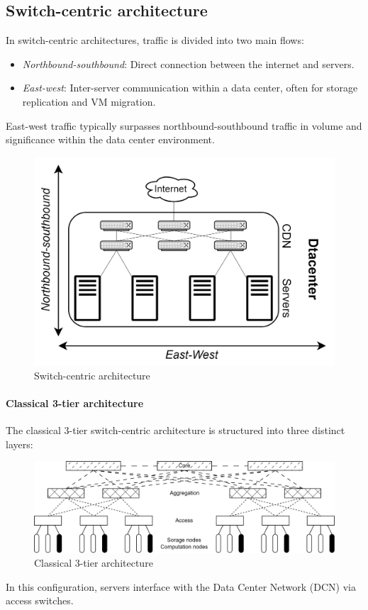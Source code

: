\subsection{Switch-centric architecture}
In switch-centric architectures, traffic is divided into two main flows:
\begin{itemize}
\item \textit{Northbound-southbound}: Direct connection between the internet and servers.
\item \textit{East-west}: Inter-server communication within a data center, often for storage replication and VM migration.
\end{itemize}
East-west traffic typically surpasses northbound-southbound traffic in volume and significance within the data center environment.
\begin{figure}[H]
    \centering
    \includegraphics[width=0.6\linewidth]{images/sc.png}
    \caption{Switch-centric architecture}
\end{figure}

\paragraph*{Classical 3-tier architecture}
The classical 3-tier switch-centric architecture is structured into three distinct layers:
\begin{figure}[H]
    \centering
    \includegraphics[width=0.75\linewidth]{images/sca.png}
    \caption{Classical 3-tier architecture} 
\end{figure}
In this configuration, servers interface with the Data Center Network (DCN) via access switches.

